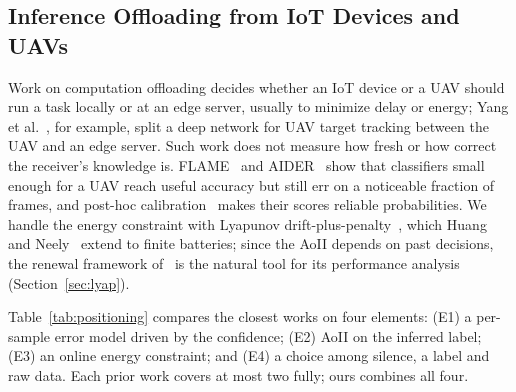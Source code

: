\documentclass[10pt,journal,compsoc]{IEEEtran}
\theoremstyle{remark}
\begin{document}
\subsection{Inference Offloading from IoT Devices and UAVs}
Work on computation offloading decides whether an IoT device or a UAV should run a task locally or at an edge server, usually to minimize delay or energy; Yang et al.~\cite{yang2020uav}, for example, split a deep network for UAV target tracking between the UAV and an edge server. Such work does not measure how fresh or how correct the receiver's knowledge is. FLAME~\cite{shamsoshoara2021flame} and AIDER~\cite{kyrkou2020aider} show that classifiers small enough for a UAV reach useful accuracy but still err on a noticeable fraction of frames, and post-hoc calibration~\cite{guo2017calibration} makes their scores reliable probabilities. We handle the energy constraint with Lyapunov drift-plus-penalty~\cite{neely2010book}, which Huang and Neely~\cite{huang2013eh} extend to finite batteries; since the AoII depends on past decisions, the renewal framework of~\cite{neely2013renewal} is the natural tool for its performance analysis (Section~\ref{sec:lyap}).


Table~\ref{tab:positioning} compares the closest works on four elements: (E1) a per-sample error model driven by the confidence; (E2) AoII on the inferred label; (E3) an online energy constraint; and (E4) a choice among silence, a label and raw data. Each prior work covers at most two fully; ours combines all four.

\begin{table}[t]
\caption{Positioning against the closest works. \checkmark: covered; $\circ$: partly covered; --: not covered.}
\label{tab:positioning}
\centering\footnotesize
\setlength{\tabcolsep}{3pt}
\end{table}
\end{document}
